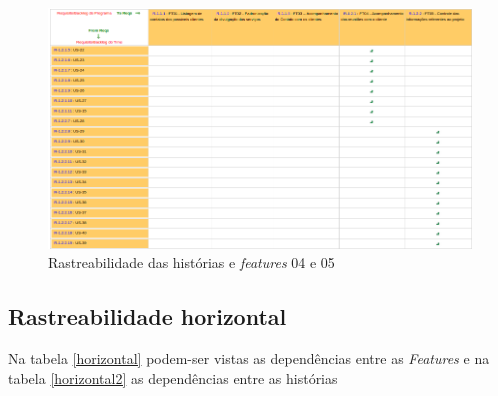 \begin{figure}[!htb]
 \centering
 \includegraphics[scale= 0.5]{figuras/ft04e05.png}
 \caption{Rastreabilidade das histórias e \textit{features} 04 e 05}
 \label{fig:ft04}
\end{figure}
% 

% 

\subsection{Rastreabilidade horizontal}

Na tabela \ref{horizontal} podem-ser vistas as dependências entre as \textit{Features} e na tabela \ref{horizontal2} as dependências
entre as histórias

